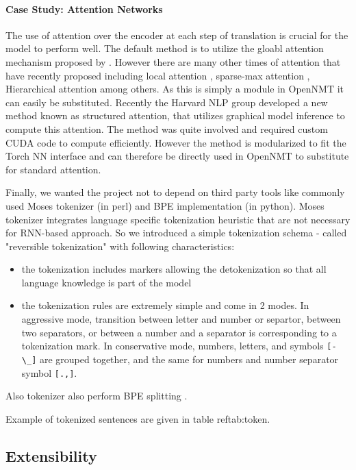 \documentclass[11pt]{article}
\begin{document}
\paragraph{Case Study: Attention Networks}

The use of attention over the encoder at each step of translation is
crucial for the model to perform well. The default method is to
utilize the gloabl attention mechanism proposed by \cite{}. However
there are many other times of attention that have recently proposed
including local attention \cite{Luong2015}, sparse-max attention
\cite{martins2016softmax}, Hierarchical attention
\cite{yang2016hierarchical} among others. As this is simply a module
in OpenNMT it can easily be substituted. Recently the Harvard NLP
group developed a new method known as structured attention,
that utilizes graphical model inference to compute this attention. The
method was quite involved and required custom CUDA code to compute
efficiently. However the method is modularized to fit the Torch NN
interface and can therefore be directly used in OpenNMT to substitute
for standard attention.


Finally, we wanted the project not to depend on third party tools like commonly used Moses tokenizer (in perl) and BPE implementation (in python). Moses tokenizer integrates language specific tokenization heuristic that are not necessary for RNN-based approach. So we introduced a simple tokenization schema - called "reversible tokenization" with following characteristics:
\begin{itemize}
\item the tokenization includes markers allowing the detokenization so that all language knowledge is part of the model
\item the tokenization rules are extremely simple and come in 2 modes. In aggressive mode, transition between letter and number or separtor, between two separators, or between a number and a separator is corresponding to a tokenization mark. In conservative mode, numbers, letters, and symbols {\tt[\-\verb!-\_!]} are grouped together, and the same for numbers and number separator symbol {\tt[.,]}.
\end{itemize}
Also tokenizer also perform BPE splitting \cite{BPE}.

Example of tokenized sentences are given in table ref{tab:token}.

\subsection{Extensibility}
\end{document}
